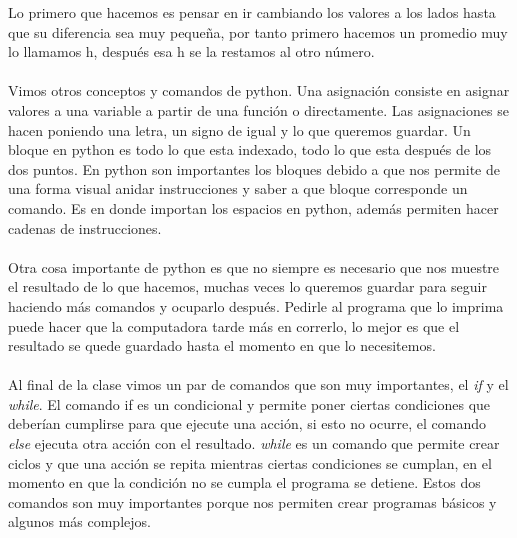 \documentclass{article}
\begin{document}
Lo primero que hacemos es pensar en ir cambiando los valores a los lados hasta que su diferencia sea muy pequeña, por tanto primero hacemos un promedio muy lo llamamos h, después esa h se la restamos al otro número.\\
\\
Vimos otros conceptos y comandos de python. Una asignación consiste en asignar valores a una variable a partir de una función o directamente. Las asignaciones se hacen poniendo una letra, un signo de igual y lo que queremos guardar.
Un bloque en python es todo lo que esta indexado, todo lo que esta después de los dos puntos. En python son importantes los bloques debido a que nos permite de una forma visual anidar instrucciones y saber a que bloque corresponde un comando. Es en donde importan los espacios en python, además permiten hacer cadenas de instrucciones.\\
\\
Otra cosa importante de python es que no siempre es necesario que nos muestre el resultado de lo que hacemos, muchas veces lo queremos guardar para seguir haciendo más comandos y ocuparlo después. Pedirle al programa que lo imprima puede hacer que la computadora tarde más en correrlo, lo mejor es que el resultado se quede guardado hasta el momento en que lo necesitemos.\\
\\
Al final de la clase vimos un par de comandos que son muy importantes, el \textit{if} y el \textit{while}. El comando if es un condicional y permite poner ciertas condiciones que deberían cumplirse para que ejecute una acción, si esto no ocurre, el comando \textit{else} ejecuta otra acción con el resultado. \textit{while} es un comando que permite crear ciclos y que una acción se repita mientras ciertas condiciones se cumplan, en el momento en que la condición no se cumpla el programa se detiene. Estos dos comandos son muy importantes porque nos permiten crear programas básicos y algunos más complejos.
\end{document}
